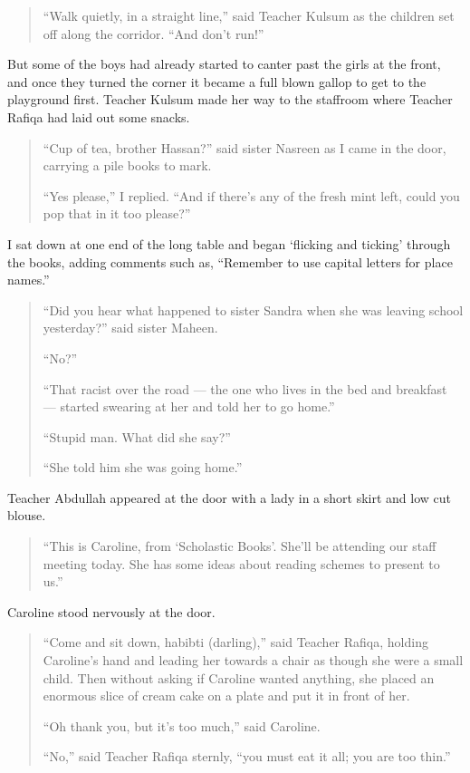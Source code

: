 \documentclass[12pt]{memoir}
\newcommand{\cor}[2]{#2} %
\begin{document}
\begin{quote}
“Walk quietly, in a straight line,”
said Teacher Kulsum as the children set off along the corridor.
“And don’t run!”
\end{quote}

But some of the boys had already started to canter past the girls at the front,
and once they turned the corner it became a full blown gallop
to get to the playground first.
Teacher \cor{Kuslum}{Kulsum} made her way to the staffroom
where Teacher Rafiqa had laid out some snacks.

\begin{quote}
“Cup of tea, brother Hassan?”
said sister Nasreen as I came in the door,
carrying a pile books to mark.

“Yes please,” I replied.
“And if there’s any of the fresh mint left,
could you pop that in it too please?”
\end{quote}

I sat down at one end of the long table
and began ‘flicking and ticking’ through the books, adding comments such as,
“Remember to use capital letters for place names.”

\begin{quote}
“Did you hear what happened to sister Sandra
when she was leaving school yesterday?” said sister Maheen.

“No?”

“That racist over the road — the one who lives in the bed and breakfast —
started swearing at her and told her to go home.”

“Stupid man.
What did she say?”

“She told him she was going home.”
\end{quote}

Teacher Abdullah appeared at the door with a lady
in a short skirt and low cut blouse.

\begin{quote}
“This is Caroline, from ‘Scholastic Books’.
She’ll be attending our staff meeting today.
She has some ideas about reading schemes to present to us.”
\end{quote}

Caroline stood nervously at the door.

\begin{quote}
“Come and sit down, habibti (darling),” said Teacher Rafiqa,
holding Caroline’s hand and leading her towards a chair
as though she were a small child.
Then without asking if Caroline wanted anything,
she placed an enormous slice of cream cake
on a plate and put it in front of her.

“Oh thank you, but it’s too much,” said Caroline.

“No,” said \cor{teacher}{Teacher} Rafiqa sternly,
“you must eat it all; you are too thin.”
\end{quote}
\end{document}
